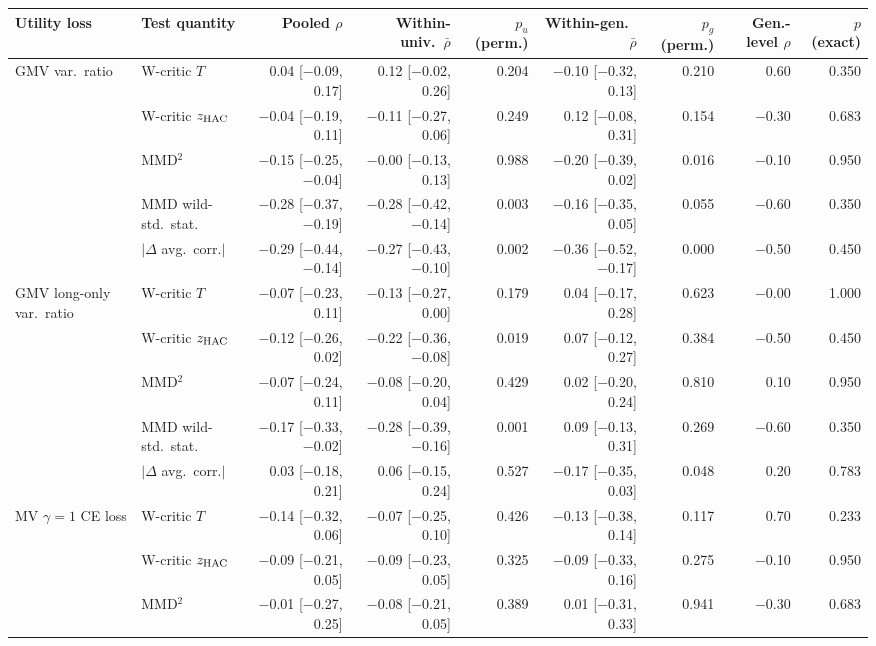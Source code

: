\begin{tabular}{llrrrrrrr}
\toprule
Utility loss & Test quantity & Pooled $\rho$ & Within-univ.\ $\bar\rho$ & $p_u$ (perm.) & Within-gen.\ $\bar\rho$ & $p_g$ (perm.) & Gen.-level $\rho$ & $p$ (exact) \\
\midrule
GMV var.\ ratio & W-critic $T$ & 0.04 [$-$0.09, 0.17] & 0.12 [$-$0.02, 0.26] & 0.204 & $-$0.10 [$-$0.32, 0.13] & 0.210 & 0.60 & 0.350 \\
 & W-critic $z_{\rm HAC}$ & $-$0.04 [$-$0.19, 0.11] & $-$0.11 [$-$0.27, 0.06] & 0.249 & 0.12 [$-$0.08, 0.31] & 0.154 & $-$0.30 & 0.683 \\
 & MMD$^2$ & $-$0.15 [$-$0.25, $-$0.04] & $-$0.00 [$-$0.13, 0.13] & 0.988 & $-$0.20 [$-$0.39, 0.02] & 0.016 & $-$0.10 & 0.950 \\
 & MMD wild-std.\ stat. & $-$0.28 [$-$0.37, $-$0.19] & $-$0.28 [$-$0.42, $-$0.14] & 0.003 & $-$0.16 [$-$0.35, 0.05] & 0.055 & $-$0.60 & 0.350 \\
 & $|\Delta$ avg.\ corr.$|$ & $-$0.29 [$-$0.44, $-$0.14] & $-$0.27 [$-$0.43, $-$0.10] & 0.002 & $-$0.36 [$-$0.52, $-$0.17] & 0.000 & $-$0.50 & 0.450 \\
GMV long-only var.\ ratio & W-critic $T$ & $-$0.07 [$-$0.23, 0.11] & $-$0.13 [$-$0.27, 0.00] & 0.179 & 0.04 [$-$0.17, 0.28] & 0.623 & $-$0.00 & 1.000 \\
 & W-critic $z_{\rm HAC}$ & $-$0.12 [$-$0.26, 0.02] & $-$0.22 [$-$0.36, $-$0.08] & 0.019 & 0.07 [$-$0.12, 0.27] & 0.384 & $-$0.50 & 0.450 \\
 & MMD$^2$ & $-$0.07 [$-$0.24, 0.11] & $-$0.08 [$-$0.20, 0.04] & 0.429 & 0.02 [$-$0.20, 0.24] & 0.810 & 0.10 & 0.950 \\
 & MMD wild-std.\ stat. & $-$0.17 [$-$0.33, $-$0.02] & $-$0.28 [$-$0.39, $-$0.16] & 0.001 & 0.09 [$-$0.13, 0.31] & 0.269 & $-$0.60 & 0.350 \\
 & $|\Delta$ avg.\ corr.$|$ & 0.03 [$-$0.18, 0.21] & 0.06 [$-$0.15, 0.24] & 0.527 & $-$0.17 [$-$0.35, 0.03] & 0.048 & 0.20 & 0.783 \\
MV $\gamma=1$ CE loss & W-critic $T$ & $-$0.14 [$-$0.32, 0.06] & $-$0.07 [$-$0.25, 0.10] & 0.426 & $-$0.13 [$-$0.38, 0.14] & 0.117 & 0.70 & 0.233 \\
 & W-critic $z_{\rm HAC}$ & $-$0.09 [$-$0.21, 0.05] & $-$0.09 [$-$0.23, 0.05] & 0.325 & $-$0.09 [$-$0.33, 0.16] & 0.275 & $-$0.10 & 0.950 \\
 & MMD$^2$ & $-$0.01 [$-$0.27, 0.25] & $-$0.08 [$-$0.21, 0.05] & 0.389 & 0.01 [$-$0.31, 0.33] & 0.941 & $-$0.30 & 0.683 \\

\end{tabular}
